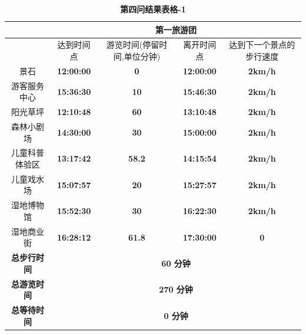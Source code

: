 \documentclass[hyperref,UTF8]{article}
\begin{document}
{\begin{table}[htbp]
  \centering
  \caption{\textbf{第四问结果表格-1}}
    \begin{tabular}{|c|c|c|c|c|}
    \hline
       & \multicolumn{4}{c|}{\textbf{第一旅游团}} \bigstrut\\
    \hline
       & \multicolumn{1}{p{4.055em}|}{达到时间点} & \multicolumn{1}{p{4.055em}|}{游览时间(停留时间,单位分钟)} & \multicolumn{1}{p{4.055em}|}{离开时间点} & \multicolumn{1}{p{4.055em}|}{达到下一个景点的步行速度} \bigstrut\\
    \hline
    \multicolumn{1}{|p{4.055em}|}{景石} & \textbf{12:00:00} & \textbf{0} & \textbf{12:00:00} & \multicolumn{1}{p{4.055em}|}{\textbf{2km/h}} \bigstrut\\
    \hline
    \multicolumn{1}{|p{4.055em}|}{游客服务中心} & \textbf{15:36:30} & \textbf{10} & \textbf{15:46:30} & \multicolumn{1}{p{4.055em}|}{\textbf{2km/h}} \bigstrut\\
    \hline
    \multicolumn{1}{|p{4.055em}|}{阳光草坪} & \textbf{12:10:48} & \textbf{60} & \textbf{13:10:48} & \multicolumn{1}{p{4.055em}|}{\textbf{2km/h}} \bigstrut\\
    \hline
    \multicolumn{1}{|p{4.055em}|}{森林小剧场} & \textbf{14:30:00} & \textbf{30} & \textbf{15:00:00} & \multicolumn{1}{p{4.055em}|}{\textbf{2km/h}} \bigstrut\\
    \hline
    \multicolumn{1}{|p{4.055em}|}{儿童科普体验区} & \textbf{13:17:42} & \textbf{58.2} & \textbf{14:15:54} & \multicolumn{1}{p{4.055em}|}{\textbf{2km/h}} \bigstrut\\
    \hline
    \multicolumn{1}{|p{4.055em}|}{儿童戏水场} & \textbf{15:07:57} & \textbf{20} & \textbf{15:27:57} & \multicolumn{1}{p{4.055em}|}{\textbf{2km/h}} \bigstrut\\
    \hline
    \multicolumn{1}{|p{4.055em}|}{湿地博物馆} & \textbf{15:52:30} & \textbf{30} & \textbf{16:22:30} & \multicolumn{1}{p{4.055em}|}{\textbf{2km/h}} \bigstrut\\
    \hline
    \multicolumn{1}{|p{4.055em}|}{湿地商业街} & \textbf{16:28:12} & \textbf{61.8} & \textbf{17:30:00} & \textbf{0} \bigstrut\\
    \hline
    \multicolumn{1}{|p{4.055em}|}{\textbf{总步行时间}} & \multicolumn{4}{c|}{\textbf{60 分钟}} \bigstrut\\
    \hline
    \multicolumn{1}{|p{4.055em}|}{\textbf{总游览时间}} & \multicolumn{4}{c|}{\textbf{270 分钟}} \bigstrut\\
    \hline
    \multicolumn{1}{|p{4.055em}|}{\textbf{总等待时间}} & \multicolumn{4}{c|}{\textbf{0 分钟}} \bigstrut\\

\end{tabular}
\end{table}}
\end{document}
